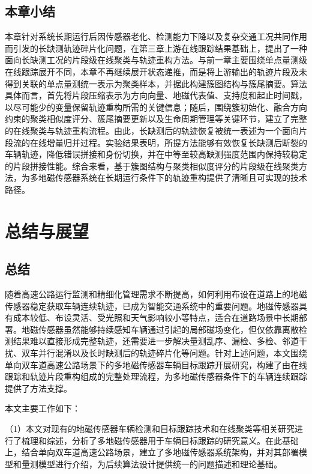 \documentclass{xdupgthesis}
\providecommand{\FloatBarrier}{}
\begin{document}
\FloatBarrier



\section{本章小结}

本章针对系统长期运行后因传感器老化、检测能力下降以及复杂交通工况共同作用而引发的长缺测轨迹碎片化问题，在第三章上游在线跟踪结果基础上，提出了一种面向长缺测工况的片段级在线聚类与轨迹重构方法。与前一章主要围绕单点量测级在线跟踪展开不同，本章不再继续展开状态递推，而是将上游输出的轨迹片段及未得到关联的单点量测统一表示为聚类样本，并据此构建簇图结构与簇尾摘要。算法具体而言，首先将片段压缩表示为方向向量、地磁代表值、支持度和起止时间戳，以尽可能少的变量保留轨迹重构所需的关键信息；随后，围绕簇初始化、融合方向约束的聚类相似度评分、簇尾摘要更新以及生命周期管理等关键环节，建立了完整的在线聚类与轨迹重构流程。由此，长缺测后的轨迹恢复被统一表述为一个面向片段流的在线增量归并过程。实验结果表明，所提方法能够有效恢复长缺测后断裂的车辆轨迹，降低错误拼接和身份切换，并在中等至较高缺测强度范围内保持较稳定的片段拼接性能。综合来看，基于簇图结构与聚类相似度评分的片段级在线聚类方法，为多地磁传感器系统在长期运行条件下的轨迹重构提供了清晰且可实现的技术路径。


\chapter{总结与展望}

\section{总结}

随着高速公路运行监测和精细化管理需求不断提高，如何利用布设在道路上的地磁传感器稳定获取车辆连续轨迹，已成为智能交通系统中的重要问题。地磁传感器具有成本较低、布设灵活、受光照和天气影响较小等特点，适合在道路场景中长期部署。地磁传感器虽然能够持续感知车辆通过引起的局部磁场变化，但仅依靠离散检测结果难以直接形成完整轨迹，还需要进一步解决量测乱序、漏检、多检、邻道干扰、双车并行混淆以及长时缺测后的轨迹碎片化等问题。针对上述问题，本文围绕单向双车道高速公路场景下的多地磁传感器车辆目标跟踪开展研究，构建了由在线跟踪和轨迹片段重构组成的完整处理流程，为多地磁传感器条件下的车辆连续跟踪提供了方法支撑。

本文主要工作如下：

（1）本文对现有的地磁传感器车辆检测和目标跟踪技术和在线聚类等相关研究进行了梳理和综述，分析了多地磁传感器用于车辆目标跟踪的研究意义。在此基础上，结合单向双车道高速公路场景，建立了多地磁传感器系统架构，并对其部署模型和量测模型进行介绍，为后续算法设计提供统一的问题描述和理论基础。
\end{document}
